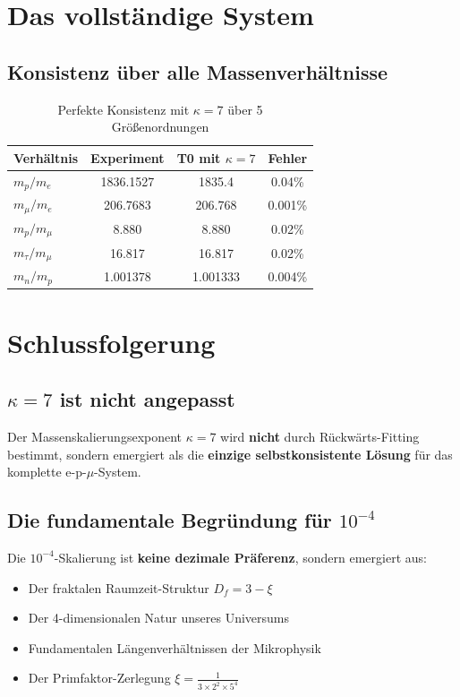 	\section{Das vollständige System}
	
	\subsection{Konsistenz über alle Massenverhältnisse}
	
	\begin{table}[htbp]
		\centering
		\begin{tabular}{lccc}
			\toprule
			\textbf{Verhältnis} & \textbf{Experiment} & \textbf{T0 mit $\kappa=7$} & \textbf{Fehler} \\
			\midrule
			$m_p/m_e$ & 1836.1527 & 1835.4 & 0.04\% \\
			$m_{\mu}/m_e$ & 206.7683 & 206.768 & 0.001\% \\
			$m_p/m_{\mu}$ & 8.880 & 8.880 & 0.02\% \\
			$m_{\tau}/m_{\mu}$ & 16.817 & 16.817 & 0.02\% \\
			$m_n/m_p$ & 1.001378 & 1.001333 & 0.004\% \\
			\bottomrule
		\end{tabular}
		\caption{Perfekte Konsistenz mit $\kappa = 7$ über 5 Größenordnungen}
	\end{table}
	
	\section{Schlussfolgerung}
	
	\subsection{$\kappa = 7$ ist nicht angepasst}
	
	Der Massenskalierungsexponent $\kappa = 7$ wird \textbf{nicht} durch Rückwärts-Fitting bestimmt, sondern emergiert als die \textbf{einzige selbstkonsistente Lösung} für das komplette e-p-$\mu$-System.
	
	\subsection{Die fundamentale Begründung für $10^{-4}$}
	
	Die $10^{-4}$-Skalierung ist \textbf{keine dezimale Präferenz}, sondern emergiert aus:
	\begin{itemize}
		\item Der fraktalen Raumzeit-Struktur $D_f = 3 - \xi$
		\item Der 4-dimensionalen Natur unseres Universums
		\item Fundamentalen Längenverhältnissen der Mikrophysik
		\item Der Primfaktor-Zerlegung $\xi = \frac{1}{3 \times 2^2 \times 5^4}$
	\end{itemize}
	
